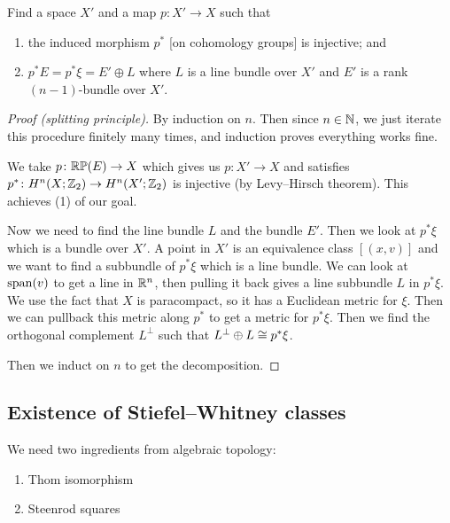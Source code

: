 \begin{goal}
Find a space $X'$ and a map $p\colon X'\to X$ such that
\begin{enumerate}
\item the induced morphism $p^{*}$ [on cohomology groups] is
  injective; and
\item $p^{*}E=p^{*}\xi=E'\oplus L$ where $L$ is a line bundle over
  $X'$ and $E'$ is a rank $(n-1)$-bundle over $X'$.
\end{enumerate}
\end{goal}

\begin{proof}[Proof (splitting principle)]
By induction on $n$.
Then since $n\in\mathbb{N}$, we just iterate this procedure finitely many
times, and induction proves everything works fine.

We take $p\colon\mathbb{R}\mathbb{P}(E)\to X$ which gives us
$p\colon X'\to X$ and satisfies $p^{*}\colon H^{n}(X;\mathbb{Z}_{2})\to H^{n}(X';\mathbb{Z}_{2})$
is injective (by Levy--Hirsch theorem). This achieves (1) of our goal.

Now we need to find the line bundle $L$ and the bundle $E'$. Then we
look at $p^{*}\xi$ which is a bundle over $X'$. A point in $X'$ is an
equivalence class $[(x,v)]$ and we want to find a subbundle of
$p^{*}\xi$ which is a line bundle.
We can look at $\operatorname{span}(v)$ to get a line in $\mathbb{R}^{n}$, then pulling it
back gives a line subbundle $L$ in $p^{*}\xi$. We use the fact that
$X$ is paracompact, so it has a Euclidean metric for $\xi$. Then we
can pullback this metric along $p^{*}$ to get a metric for
$p^{*}\xi$. Then we find the orthogonal complement $L^{\perp}$ such
that $L^{\perp}\oplus L\cong p^{*}\xi$.

Then we induct on $n$ to get the decomposition.
\end{proof}

\subsection{Existence of Stiefel--Whitney classes}

\begin{node}
We need two ingredients from algebraic topology:
\begin{enumerate}
\item Thom isomorphism
\item Steenrod squares
\end{enumerate}
\end{node}

